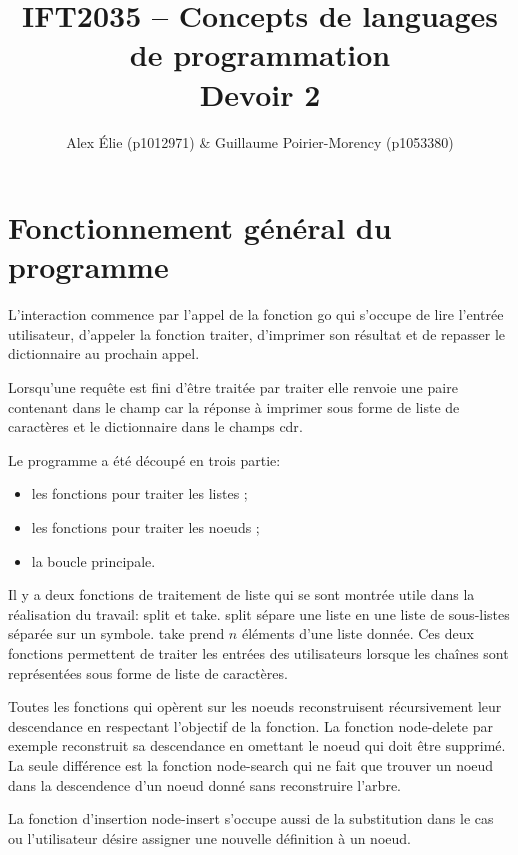 \documentclass{article}
\title{IFT2035 -- Concepts de languages de programmation \\ Devoir 2}
\author{Alex Élie (p1012971) \& Guillaume Poirier-Morency (p1053380)}
\begin{document}
  \maketitle

  \section{Fonctionnement général du programme}
  L'interaction commence par l'appel de la fonction \textsf{go} qui s'occupe de
  lire l'entrée utilisateur, d'appeler la fonction \textsf{traiter}, d'imprimer
  son résultat et de repasser le dictionnaire au prochain appel.

  Lorsqu'une requête est fini d'être traitée par \textsf{traiter} elle renvoie
  une paire contenant dans le champ \textsf{car} la réponse à imprimer sous
  forme de liste de caractères et le dictionnaire dans le champs \textsf{cdr}.

  Le programme a été découpé en trois partie:
  \begin{itemize}
    \item les fonctions pour traiter les listes ;
    \item les fonctions pour traiter les noeuds ;
    \item la boucle principale.
  \end{itemize}

  Il y a deux fonctions de traitement de liste qui se sont montrée utile dans la
  réalisation du travail: \textsf{split} et \textsf{take}. \textsf{split} sépare
  une liste en une liste de sous-listes séparée sur un symbole. \textsf{take}
  prend $n$ éléments d'une liste donnée. Ces deux fonctions permettent de
  traiter les entrées des utilisateurs lorsque les chaînes sont représentées
  sous forme de liste de caractères.

  Toutes les fonctions qui opèrent sur les noeuds reconstruisent récursivement
  leur descendance en respectant l'objectif de la fonction. La fonction
  \textsf{node-delete} par exemple reconstruit sa descendance en omettant le
  noeud qui doit être supprimé. La seule différence est la fonction
  \textsf{node-search} qui ne fait que trouver un noeud dans la descendence d'un
  noeud donné sans reconstruire l'arbre.

  La fonction d'insertion \textsf{node-insert} s'occupe aussi de la substitution
  dans le cas ou l'utilisateur désire assigner une nouvelle définition à un
  noeud.

  
\end{document}
